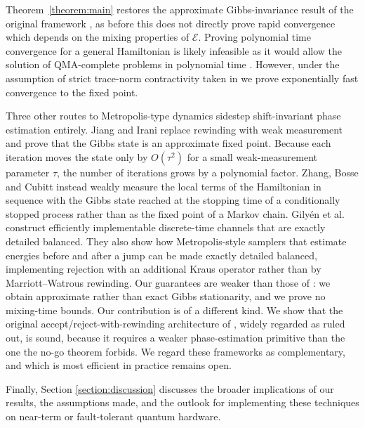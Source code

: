 Theorem~\ref{theorem:main} restores the approximate Gibbs-invariance result of the original framework \cite{Temme_2011}, as before this does not directly prove rapid convergence which depends on the mixing properties of $\mathcal{E}$. Proving polynomial time convergence for a general Hamiltonian is likely infeasible as it would allow the solution of QMA-complete problems in polynomial time \cite{kempe2006complexity}. However, under the assumption of strict trace-norm contractivity taken in \cite{Temme_2011} we prove exponentially fast convergence to the fixed point.

Three other routes to Metropolis-type dynamics sidestep shift-invariant phase estimation entirely. Jiang and Irani \cite{jiang2024quantummetropolissamplingweak} replace rewinding with weak measurement and prove that the Gibbs state is an approximate fixed point. Because each iteration moves the state only by $O(\tau^2)$ for a small weak-measurement parameter $\tau$, the number of iterations grows by a polynomial factor. Zhang, Bosse and Cubitt \cite{zhang2023dissipative} instead weakly measure the local terms of the Hamiltonian in sequence with the Gibbs state reached at the stopping time of a conditionally stopped process rather than as the fixed point of a Markov chain. Gilyén et al. \cite{gilyen2024quantum} construct efficiently implementable discrete-time channels that are exactly detailed balanced. They also show how Metropolis-style samplers that estimate energies before and after a jump can be made exactly detailed balanced, implementing rejection with an additional Kraus operator rather than by Marriott–Watrous rewinding. Our guarantees are weaker than those of \cite{gilyen2024quantum}: we obtain approximate rather than exact Gibbs stationarity, and we prove no mixing-time bounds. Our contribution is of a different kind. We show that the original accept/reject-with-rewinding architecture of \cite{Temme_2011}, widely regarded as ruled out, is sound, because it requires a weaker phase-estimation primitive than the one the no-go theorem \cite{chen2023quantumthermalstatepreparation} forbids. We regard these frameworks as complementary, and which is most efficient in practice remains open.

    Finally, Section \ref{section:discussion} discusses the broader implications of our results, the assumptions made, and the outlook for implementing these techniques on near-term or fault-tolerant quantum hardware.



